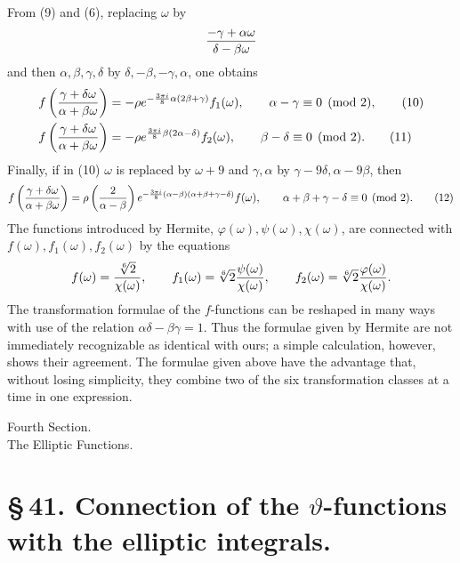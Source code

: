 \documentclass[11pt]{article}
\newcommand{\Jac}[2]{\left(\frac{#1}{#2}\right)}
\begin{document}
From (9) and (6), replacing $\omega$ by
\[
{-\gamma+
\alpha\omega\over\delta-
\beta\omega}
\]
and then $\alpha,\beta,\gamma,\delta$ by $\delta,-\beta,-\gamma,\alpha$, one obtains
\begin{align}
f\left({\gamma+
\delta\omega\over\alpha+
\beta\omega}\right)
&=-\rho e^{-\frac{3\pi i}{8}\alpha(2\beta+
\gamma)}f_1(\omega),
\qquad \alpha-
\gamma\equiv0\pmod2, \tag{10}\\
f\left({\gamma+
\delta\omega\over\alpha+
\beta\omega}\right)
&=-\rho e^{\frac{3\pi i}{8}\beta(2\alpha-
\delta)}f_2(\omega),
\qquad \beta-
\delta\equiv0\pmod2. \tag{11}
\end{align}
Finally, if in (10) $\omega$ is replaced by $\omega+9$ and $\gamma,
\alpha$ by $\gamma-9\delta,
\alpha-9\beta$, then
\begin{equation}
f\left({\gamma+
\delta\omega\over\alpha+
\beta\omega}\right)
=\rho\Jac{2}{\alpha-
\beta}e^{-\frac{3\pi i}{8}(\alpha-
\beta)(\alpha+
\beta+
\gamma-
\delta)}f(\omega),
\qquad \alpha+
\beta+
\gamma-
\delta\equiv0\pmod2.
\tag{12}
\end{equation}
The functions introduced by Hermite, $\varphi(\omega),\psi(\omega),\chi(\omega)$, are connected with $f(\omega),f_1(\omega),f_2(\omega)$ by the equations
\[
f(\omega)={\sqrt[6]{2}\over\chi(\omega)},
\qquad
f_1(\omega)=\sqrt[6]{2}{\psi(\omega)\over\chi(\omega)},
\qquad
f_2(\omega)=\sqrt[6]{2}{\varphi(\omega)\over\chi(\omega)}.
\]
The transformation formulae of the $f$-functions can be reshaped in many ways with use of the relation $\alpha\delta-\beta\gamma=1$. Thus the formulae given by Hermite are not immediately recognizable as identical with ours; a simple calculation, however, shows their agreement. The formulae given above have the advantage that, without losing simplicity, they combine two of the six transformation classes at a time in one expression.

\begin{center}
{\large Fourth Section.}\\[0.7em]
{\Large The Elliptic Functions.}
\end{center}

\section*{\S\,41. Connection of the $\vartheta$-functions with the elliptic integrals.}
\end{document}

